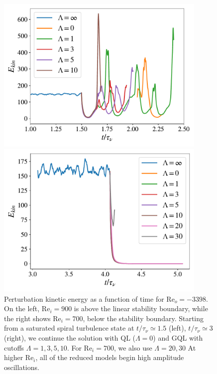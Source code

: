 \documentclass[openacc]{rstransa}%
\newcommand{\Reyn}{\mathrm{Re}}
\begin{document}
\begin{figure}
    \centering
    \begin{minipage}{0.45\textwidth}
        \centering
        \includegraphics[width=0.9\textwidth]{figs/rei900_reo_-3398_KE_vs_t.pdf}
    \end{minipage}
    \begin{minipage}{0.45\textwidth}
        \centering
        \includegraphics[width=0.9\textwidth]{figs/rei700_reo_-3398_KE_vs_t.pdf}
    \end{minipage}
    \caption{Perturbation kinetic energy as a function of time for $\Reyn_o=-3398$. On the left,  $\Reyn_i = 900$ is above the linear stability boundary, while the right shows $\Reyn_i = 700$, below the stability boundary. Starting from a saturated spiral turbulence state at $t/\tau_\nu \simeq 1.5$ (left), $t/\tau_\nu \simeq 3$ (right), we continue the solution with QL ($\Lambda = 0$) and GQL with cutoffs $\Lambda = 1,3,5,10$. For $\Reyn_i = 700$, we also use $\Lambda = 20, 30$ At higher $\Reyn_i$, all of the reduced models begin high amplitude oscillations. }
    \label{fig:ke_vs_t_rei900}
\end{figure}
\end{document}
